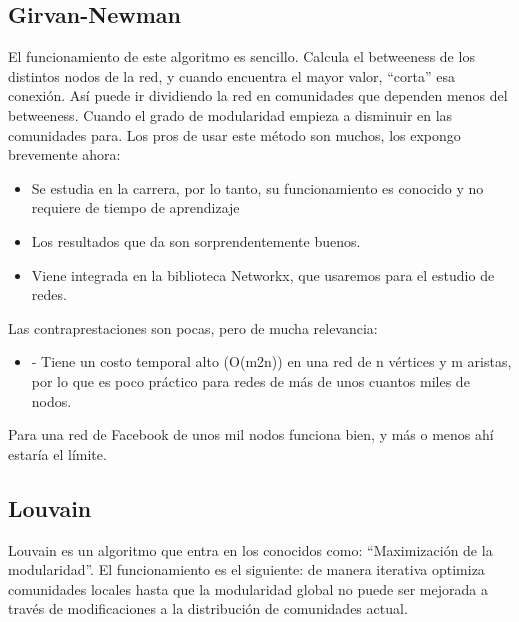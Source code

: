\subsection{Girvan-Newman}
El funcionamiento de este algoritmo es sencillo. Calcula el betweeness de los distintos nodos de la red, y cuando encuentra el mayor valor, “corta” esa conexión. Así puede ir dividiendo la red en comunidades que dependen menos del betweeness. Cuando el grado de modularidad empieza a disminuir en las comunidades para.
Los pros de usar este método son muchos, los expongo brevemente ahora:
\begin{itemize}
	\item Se estudia en la carrera, por lo tanto, su funcionamiento es conocido y no requiere de tiempo de aprendizaje
	\item Los resultados que da son sorprendentemente buenos.
	\item Viene integrada en la biblioteca Networkx, que usaremos para el estudio de redes.
\end{itemize}
Las contraprestaciones son pocas, pero de mucha relevancia:
\begin{itemize}
	\item -	Tiene un costo temporal alto (O(m2n)) en una red de n vértices y m aristas, por lo que es poco práctico para redes de más de unos cuantos miles de nodos. \cite{girvan-newman}
\end{itemize}
Para una red de Facebook de unos mil nodos funciona bien, y más o menos ahí estaría el límite. \cite{girvan-newman}
\subsection{Louvain}
Louvain es un algoritmo que entra en los conocidos como: “Maximización de la modularidad”.
El funcionamiento es el siguiente: de manera iterativa optimiza comunidades locales hasta que la modularidad global no puede ser mejorada a través de modificaciones a la distribución de comunidades actual. \cite{wiki:louvain}

